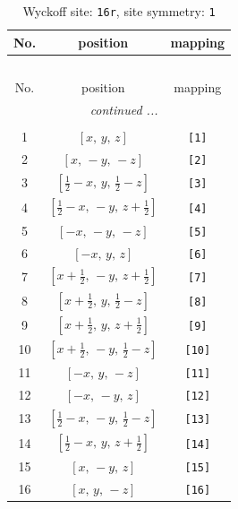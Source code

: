 \documentclass[fleqn,8pt]{jsarticle}
\begin{document}
\begin{longtable}{ccc}
\caption{Wyckoff site: {\tt 16r}, site symmetry: {\tt 1}}
 \\
 \hline \hline
No. & position & mapping \\ \hline \endfirsthead

\multicolumn{2}{l}{\tablename\ \thetable{}} \\
 \hline \hline
No. & position & mapping \\ \hline \endhead

 \hline \hline
\multicolumn{2}{r}{\footnotesize\it continued ...} \\ \endfoot

 \hline \hline
\multicolumn{2}{r}{} \\ \endlastfoot

1 & $\left[ x,\, y,\, z \right]$ & {\tt [1]} \\ \hline
2 & $\left[ x,\, - y,\, - z \right]$ & {\tt [2]} \\ \hline
3 & $\left[ \frac{1}{2} - x,\, y,\, \frac{1}{2} - z \right]$ & {\tt [3]} \\ \hline
4 & $\left[ \frac{1}{2} - x,\, - y,\, z + \frac{1}{2} \right]$ & {\tt [4]} \\ \hline
5 & $\left[ - x,\, - y,\, - z \right]$ & {\tt [5]} \\ \hline
6 & $\left[ - x,\, y,\, z \right]$ & {\tt [6]} \\ \hline
7 & $\left[ x + \frac{1}{2},\, - y,\, z + \frac{1}{2} \right]$ & {\tt [7]} \\ \hline
8 & $\left[ x + \frac{1}{2},\, y,\, \frac{1}{2} - z \right]$ & {\tt [8]} \\ \hline
9 & $\left[ x + \frac{1}{2},\, y,\, z + \frac{1}{2} \right]$ & {\tt [9]} \\ \hline
10 & $\left[ x + \frac{1}{2},\, - y,\, \frac{1}{2} - z \right]$ & {\tt [10]} \\ \hline
11 & $\left[ - x,\, y,\, - z \right]$ & {\tt [11]} \\ \hline
12 & $\left[ - x,\, - y,\, z \right]$ & {\tt [12]} \\ \hline
13 & $\left[ \frac{1}{2} - x,\, - y,\, \frac{1}{2} - z \right]$ & {\tt [13]} \\ \hline
14 & $\left[ \frac{1}{2} - x,\, y,\, z + \frac{1}{2} \right]$ & {\tt [14]} \\ \hline
15 & $\left[ x,\, - y,\, z \right]$ & {\tt [15]} \\ \hline
16 & $\left[ x,\, y,\, - z \right]$ & {\tt [16]} \\
\end{longtable}
\end{document}
